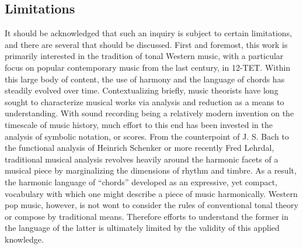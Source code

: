 \subsection{Limitations}
\label{subsec:limitations}

It should be acknowledged that such an inquiry is subject to certain limitations, and there are several that should be discussed.
First and foremost, this work is primarily interested in the tradition of tonal Western music, with a particular focus on popular contemporary music from the last century, in 12-TET.
Within this large body of content, the use of harmony and the language of chords has steadily evolved over time.
Contextualizing briefly, music theorists have long sought to characterize musical works via analysis and reduction as a means to understanding.
With sound recording being a relatively modern invention on the timescale of music history, much effort to this end has been invested in the analysis of symbolic notation, or scores.
From the counterpoint of J. S. Bach to the functional analysis of Heinrich Schenker or more recently Fred Lehrdal, traditional musical analysis revolves heavily around the harmonic facets of a musical piece by marginalizing the dimensions of rhythm and timbre.
As a result, the harmonic language of ``chords'' developed as an expressive, yet compact, vocabulary with which one might describe a piece of music harmonically.
Western pop music, however, is not wont to consider the rules of conventional tonal theory or compose by traditional means.
Therefore efforts to understand the former in the language of the latter is ultimately limited by the validity of this applied knowledge.


